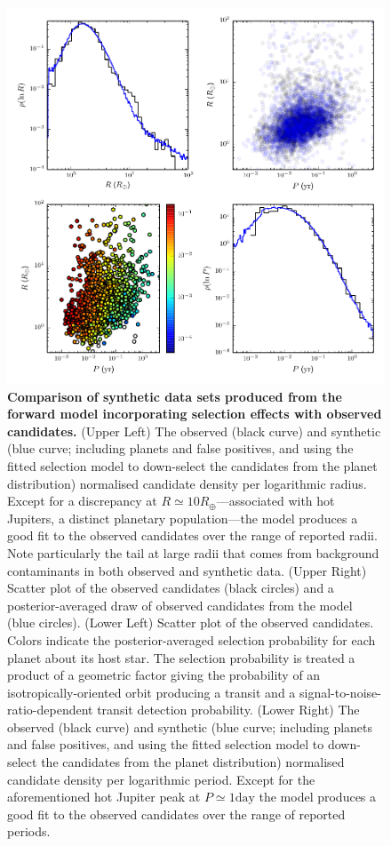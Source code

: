 \documentclass{nature}
\newcommand{\REarth}{R_\oplus}
\begin{document}
\begin{figure}
  \includegraphics[width=\columnwidth]{selection}
  \caption{\label{fig:selection} \textbf{Comparison of synthetic data
      sets produced from the forward model incorporating selection
      effects with observed candidates.}  (Upper Left) The observed
    (black curve) and synthetic (blue curve; including planets and
    false positives, and using the fitted selection model to
    down-select the candidates from the planet distribution)
    normalised candidate density per logarithmic radius.  Except for a
    discrepancy at $R \simeq 10 \REarth$---associated with hot
    Jupiters, a distinct planetary
    population\cite{Albrecht2012,Naoz2012}---the model produces a good
    fit to the observed candidates over the range of reported radii.
    Note particularly the tail at large radii that comes from
    background contaminants in both observed and synthetic data.
    (Upper Right) Scatter plot of the observed candidates (black
    circles) and a posterior-averaged draw of observed candidates from
    the model (blue circles).  (Lower Left) Scatter plot of the
    observed candidates.  Colors indicate the posterior-averaged
    selection probability for each planet about its host star.  
    The selection probability is treated a product of a geometric
    factor giving the probability of an isotropically-oriented orbit
    producing a transit and a signal-to-noise-ratio-dependent transit
    detection probability.  (Lower Right) The observed (black curve)
    and synthetic (blue curve; including planets and false positives,
    and using the fitted selection model to down-select the candidates
    from the planet distribution) normalised candidate density per
    logarithmic period.  Except for the aforementioned hot Jupiter
    peak at $P \simeq 1 \mathrm{day}$ the model produces a good fit to
    the observed candidates over the range of reported periods.}
\end{figure}
\end{document}
